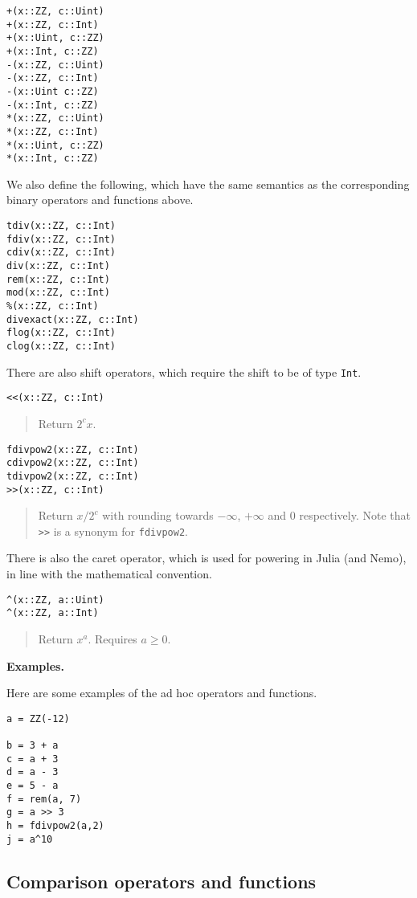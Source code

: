 \documentclass[a4paper,10pt]{article}
\newcommand{\code}{\lstinline}
\newcommand{\desc}[1]{\vspace{-3mm}\begin{quote}#1\end{quote}}
\begin{document}
{{{{{{\begin{lstlisting}
+(x::ZZ, c::Uint)
+(x::ZZ, c::Int)
+(x::Uint, c::ZZ)
+(x::Int, c::ZZ)
-(x::ZZ, c::Uint)
-(x::ZZ, c::Int)
-(x::Uint c::ZZ)
-(x::Int, c::ZZ)
*(x::ZZ, c::Uint)
*(x::ZZ, c::Int)
*(x::Uint, c::ZZ)
*(x::Int, c::ZZ)
\end{lstlisting}

We also define the following, which have the same semantics as the corresponding
binary operators and functions above.

\begin{lstlisting}
tdiv(x::ZZ, c::Int)
fdiv(x::ZZ, c::Int)
cdiv(x::ZZ, c::Int)
div(x::ZZ, c::Int)
rem(x::ZZ, c::Int)
mod(x::ZZ, c::Int)
%(x::ZZ, c::Int)
divexact(x::ZZ, c::Int)
flog(x::ZZ, c::Int)
clog(x::ZZ, c::Int)
\end{lstlisting}

There are also shift operators, which require the shift to be of type \code{Int}.

\begin{lstlisting}
<<(x::ZZ, c::Int)
\end{lstlisting}

\desc{Return $2^c x$.}

\begin{lstlisting}
fdivpow2(x::ZZ, c::Int)
cdivpow2(x::ZZ, c::Int)
tdivpow2(x::ZZ, c::Int)
>>(x::ZZ, c::Int)
\end{lstlisting}

\desc{Return $x/2^c$ with rounding towards $-\infty$, $+\infty$ and $0$ respectively. 
Note that \code{>>} is a synonym for \code{fdivpow2}.}

There is also the caret operator, which is used for powering in Julia (and Nemo), in
line with the mathematical convention.

\begin{lstlisting}
^(x::ZZ, a::Uint)
^(x::ZZ, a::Int)
\end{lstlisting}

\desc{Return $x^a$. Requires $a \geq 0$.}

\textbf{Examples.}

Here are some examples of the ad hoc operators and functions.

\begin{lstlisting}
a = ZZ(-12)

b = 3 + a
c = a + 3
d = a - 3
e = 5 - a
f = rem(a, 7)
g = a >> 3
h = fdivpow2(a,2)
j = a^10
\end{lstlisting}

\subsection{Comparison operators and functions}

}}}}}}
\end{document}
